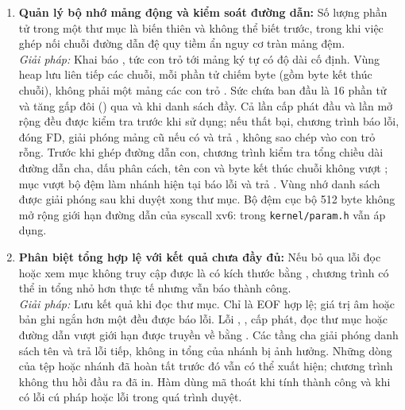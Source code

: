 \begin{enumerate}[noitemsep, topsep=2pt]
    \item \textbf{Quản lý bộ nhớ mảng động và kiểm soát đường dẫn:}
    Số lượng phần tử trong một thư mục là biến thiên và không thể biết trước, trong khi việc ghép nối chuỗi đường dẫn đệ quy tiềm ẩn nguy cơ tràn mảng đệm. \\
    \textit{Giải pháp:} Khai báo , tức con trỏ
    tới mảng ký tự có độ dài cố định. Vùng heap lưu liên tiếp các chuỗi, mỗi phần tử
    chiếm  byte (gồm byte kết thúc chuỗi), không phải một mảng
    các con trỏ . Sức chứa ban đầu là 16 phần tử và tăng gấp đôi
    () qua  và  khi danh sách đầy.
    Cả lần cấp phát đầu và lần mở rộng đều được kiểm tra trước khi sử dụng;
    nếu thất bại, chương trình báo lỗi, đóng FD, giải phóng mảng cũ nếu có và trả
    , không sao chép vào con trỏ rỗng.
    Trước khi ghép đường dẫn con, chương trình kiểm tra tổng chiều dài đường dẫn
    cha, dấu phân cách, tên con và byte kết thúc chuỗi không vượt ;
    mục vượt bộ đệm làm nhánh hiện tại báo lỗi và trả .
    Vùng nhớ danh sách được giải phóng sau khi duyệt
    xong thư mục. Bộ đệm
    cục bộ 512 byte không mở rộng giới hạn đường dẫn của syscall xv6:
     trong \texttt{kernel/param.h} vẫn áp dụng.

    \item \textbf{Phân biệt tổng hợp lệ với kết quả chưa đầy đủ:}
    Nếu bỏ qua lỗi đọc hoặc xem mục không truy cập được là có kích thước bằng
    , chương trình có thể in tổng nhỏ hơn thực tế nhưng vẫn báo thành công. \\
    \textit{Giải pháp:} Lưu kết quả  khi đọc thư mục. Chỉ
     là EOF hợp lệ; giá trị âm hoặc bản ghi ngắn hơn một
     đều được báo lỗi. Lỗi , ,
    cấp phát, đọc thư mục hoặc đường dẫn vượt giới hạn được truyền về bằng
    . Các tầng cha giải phóng danh sách tên và trả lỗi tiếp, không in
    tổng của nhánh bị ảnh hưởng. Những dòng của tệp hoặc nhánh đã hoàn tất trước
    đó vẫn có thể xuất hiện; chương trình không thu hồi đầu ra đã in.
    Hàm  dùng mã thoát  khi tính thành công và 
    khi có lỗi cú pháp hoặc lỗi trong quá trình duyệt.
\end{enumerate}
